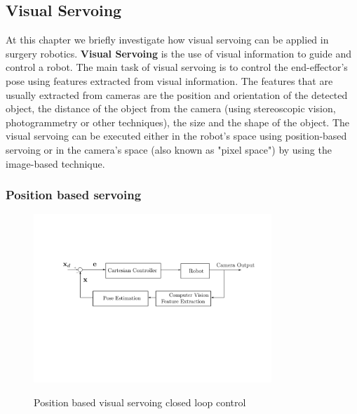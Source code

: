 \subsection{Visual Servoing}

At this chapter we briefly investigate how visual servoing can be applied in surgery robotics. \textbf{Visual Servoing} is the use of visual information 
to guide and control a robot. The main task of visual servoing is to control the end-effector's pose using features extracted from visual information. The 
features that are usually extracted from cameras are the position and orientation of the detected object, the distance of the object from the camera (using 
stereoscopic vision, photogrammetry or other techniques), the size and the shape of the object. The visual servoing can be executed either in the robot's space 
using position-based servoing or in the camera's space (also known as "pixel space") by using the image-based technique.

\subsubsection{Position based servoing}

\begin{center}
\begin{figure}[H]
\centering
\includegraphics[width=0.8\textwidth]{images/visual-servoing-position-based.png}\\
\caption{Position based visual servoing closed loop control}
\end{figure}
\end{center}

